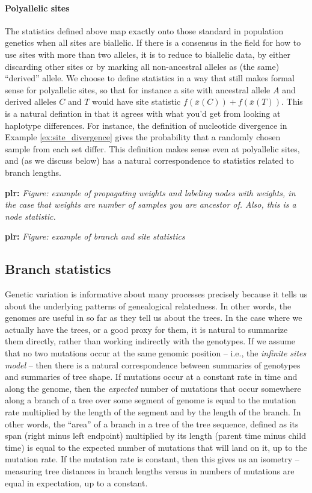 \documentclass{article}
\newcommand{\aw}{{\bar x}} %
\newcommand{\plr}[1]{{\color{blue}\textbf{plr:} \it #1}}
\begin{document}
\paragraph{Polyallelic sites}
The statistics defined above map exactly onto those standard in population genetics
when all sites are biallelic.
If there is a consensus in the field
for how to use sites with more than two alleles,
it is to reduce to biallelic data, by either discarding other sites
or by marking all non-ancestral alleles as (the same) ``derived'' allele.
We choose to define statistics in a way that still makes formal sense for polyallelic sites,
so that for instance a site with ancestral allele $A$ and derived alleles $C$ and $T$
would have site statistic $f(\aw(C)) + f(\aw(T))$.
This is a natural defintion in that it agrees with what you'd get
from looking at haplotype differences.
For instance, the definition of nucleotide divergence in Example \ref{ex:site_divergence}
gives the probability that a randomly chosen sample from each set differ.
This definition makes sense even at polyallelic sites,
and (as we discuss below) has a natural correspondence to statistics related to branch lengths.

\plr{Figure: example of propagating weights and labeling nodes with weights,
    in the case that weights are number of samples you are ancestor of.
    Also, this is a node statistic.}

\plr{Figure: example of branch and site statistics}


\subsection*{Branch statistics}

Genetic variation is informative about many processes
precisely because it tells us about the underlying patterns of genealogical relatedness.
In other words, the genomes are useful in so far as they tell us about the trees.
In the case where we actually have the trees, or a good proxy for them,
it is natural to summarize them directly, rather than working indirectly with the genotypes.
If we assume that no two mutations occur at the same genomic position --
i.e., the \emph{infinite sites model} --
then there is a natural correspondence between summaries of genotypes and summaries of tree shape.
If mutations occur at a constant rate in time and along the genome,
then the \emph{expected} number of mutations that occur somewhere along a branch of a tree
over some segment of genome
is equal to the mutation rate multiplied by the length of the segment and by the length of the branch.
In other words, the ``area'' of a branch in a tree of the tree sequence,
defined as its span (right minus left endpoint) multiplied by its length (parent time minus child time)
is equal to the expected number of mutations that will land on it, up to the mutation rate.
If the mutation rate is constant,
then this gives us an isometry --
measuring tree distances in branch lengths versus in numbers of mutations
are equal in expectation, up to a constant.
\end{document}
